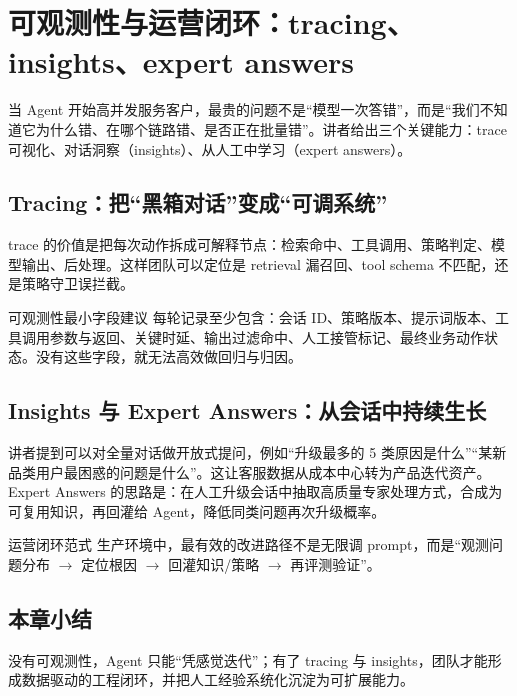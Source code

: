\section{可观测性与运营闭环：tracing、insights、expert answers}

当 Agent 开始高并发服务客户，最贵的问题不是“模型一次答错”，而是“我们不知道它为什么错、在哪个链路错、是否正在批量错”。讲者给出三个关键能力：trace 可视化、对话洞察（insights）、从人工中学习（expert answers）。

\subsection{Tracing：把“黑箱对话”变成“可调系统”}

trace 的价值是把每次动作拆成可解释节点：检索命中、工具调用、策略判定、模型输出、后处理。这样团队可以定位是 retrieval 漏召回、tool schema 不匹配，还是策略守卫误拦截。

\begin{knowledgebox}{可观测性最小字段建议}
每轮记录至少包含：会话 ID、策略版本、提示词版本、工具调用参数与返回、关键时延、输出过滤命中、人工接管标记、最终业务动作状态。没有这些字段，就无法高效做回归与归因。
\end{knowledgebox}

\subsection{Insights 与 Expert Answers：从会话中持续生长}

讲者提到可以对全量对话做开放式提问，例如“升级最多的 5 类原因是什么”“某新品类用户最困惑的问题是什么”。这让客服数据从成本中心转为产品迭代资产。
Expert Answers 的思路是：在人工升级会话中抽取高质量专家处理方式，合成为可复用知识，再回灌给 Agent，降低同类问题再次升级概率。

\begin{importantbox}{运营闭环范式}
生产环境中，最有效的改进路径不是无限调 prompt，而是“观测问题分布 $\rightarrow$ 定位根因 $\rightarrow$ 回灌知识/策略 $\rightarrow$ 再评测验证”。
\end{importantbox}

\subsection{本章小结}

没有可观测性，Agent 只能“凭感觉迭代”；有了 tracing 与 insights，团队才能形成数据驱动的工程闭环，并把人工经验系统化沉淀为可扩展能力。

